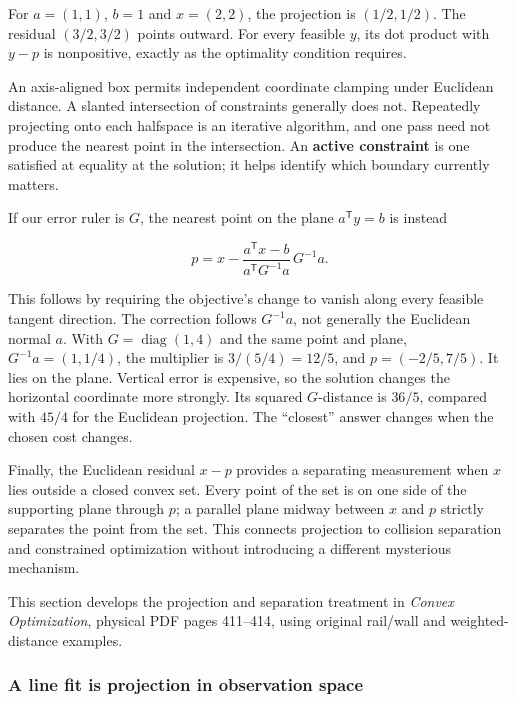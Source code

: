For \(a=(1,1)\), \(b=1\) and \(x=(2,2)\), the projection is \((1/2,1/2)\). The residual \((3/2,3/2)\) points outward. For every feasible \(y\), its dot product with \(y-p\) is nonpositive, exactly as the optimality condition requires.

An axis-aligned box permits independent coordinate clamping under Euclidean distance. A slanted intersection of constraints generally does not. Repeatedly projecting onto each halfspace is an iterative algorithm, and one pass need not produce the nearest point in the intersection. An \textbf{active constraint} is one satisfied at equality at the solution; it helps identify which boundary currently matters.

If our error ruler is \(G\), the nearest point on the plane \(a^{\mathsf T}y=b\) is instead

\[
p=x-\frac{a^{\mathsf T}x-b}{a^{\mathsf T}G^{-1}a}\,G^{-1}a.
\]

This follows by requiring the objective's change to vanish along every feasible tangent direction. The correction follows \(G^{-1}a\), not generally the Euclidean normal \(a\). With \(G=\operatorname{diag}(1,4)\) and the same point and plane, \(G^{-1}a=(1,1/4)\), the multiplier is \(3/(5/4)=12/5\), and \(p=(-2/5,7/5)\). It lies on the plane. Vertical error is expensive, so the solution changes the horizontal coordinate more strongly. Its squared \(G\)-distance is \(36/5\), compared with \(45/4\) for the Euclidean projection. The ``closest'' answer changes when the chosen cost changes.

Finally, the Euclidean residual \(x-p\) provides a separating measurement when \(x\) lies outside a closed convex set. Every point of the set is on one side of the supporting plane through \(p\); a parallel plane midway between \(x\) and \(p\) strictly separates the point from the set. This connects projection to collision separation and constrained optimization without introducing a different mysterious mechanism.

This section develops the projection and separation treatment in \emph{Convex Optimization}, physical PDF pages 411--414, using original rail/wall and weighted-distance examples.

\subsubsection{A line fit is projection in observation space}\label{01-foundations-i-ch017-a-line-fit-is-projection-in-observation-space}

